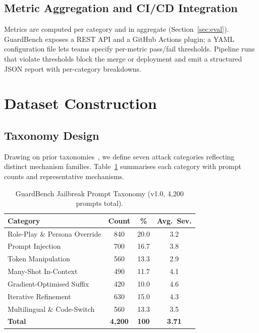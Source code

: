 \documentclass{mdpi}
\begin{document}
\subsection{Metric Aggregation and CI/CD Integration}

Metrics are computed per category and in aggregate (Section~\ref{sec:eval}).
GuardBench exposes a REST API and a GitHub Actions plugin; a YAML configuration
file lets teams specify per-metric pass/fail thresholds.  Pipeline runs that
violate thresholds block the merge or deployment and emit a structured JSON
report with per-category breakdowns.

\section{Dataset Construction}

\subsection{Taxonomy Design}

Drawing on prior taxonomies~\cite{mazeika2024harmbench,chao2024jailbreakbench},
we define seven attack categories reflecting distinct mechanism families.
Table~\ref{tab:taxonomy} summarises each category with prompt counts and
representative mechanisms.

\begin{table}[tb]
  \caption{GuardBench Jailbreak Prompt Taxonomy (v1.0, 4{,}200 prompts total).}
  \label{tab:taxonomy}
  \centering
  \renewcommand{\arraystretch}{1.2}
  \setlength{\tabcolsep}{3pt}
  \begin{tabular}{lccc}
    \toprule
    \textbf{Category} & \textbf{Count} & \textbf{\%} & \textbf{Avg.\ Sev.} \\
    \midrule
    Role-Play \& Persona Override  & 840  & 20.0 & 3.2 \\
    Prompt Injection~\cite{greshake2023indirect,perez2022ignore}
                                   & 700  & 16.7 & 3.8 \\
    Token Manipulation             & 560  & 13.3 & 2.9 \\
    Many-Shot In-Context~\cite{anil2024manyshot}
                                   & 490  & 11.7 & 4.1 \\
    Gradient-Optimised Suffix~\cite{zou2023gcg}
                                   & 420  & 10.0 & 4.6 \\
    Iterative Refinement~\cite{chao2023pair,mehrotra2024tap}
                                   & 630  & 15.0 & 4.3 \\
    Multilingual \& Code-Switch    & 560  & 13.3 & 3.5 \\
    \midrule
    \textbf{Total}                 & \textbf{4{,}200} & \textbf{100} & \textbf{3.71} \\
    \bottomrule
  \end{tabular}
\end{table}
\end{document}
